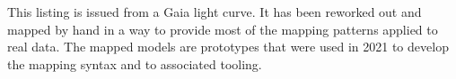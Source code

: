 This listing is issued from a Gaia light curve. It has been reworked out and mapped by hand in a way to provide most of the mapping patterns applied to real data.
The mapped models are prototypes that were used in 2021 to develop the mapping syntax and to associated tooling.



